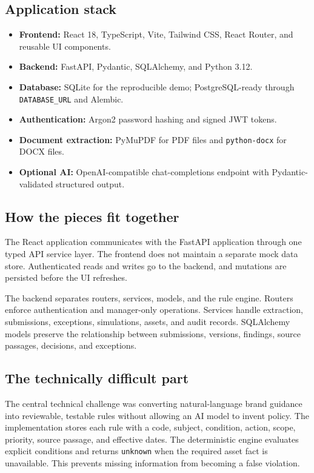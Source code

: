 \documentclass[11pt,a4paper]{article}
\begin{document}
\subsection{Application stack}

\begin{itemize}[leftmargin=*,itemsep=2pt]
  \item \textbf{Frontend:} React 18, TypeScript, Vite, Tailwind CSS, React Router, and reusable UI components.
  \item \textbf{Backend:} FastAPI, Pydantic, SQLAlchemy, and Python 3.12.
  \item \textbf{Database:} SQLite for the reproducible demo; PostgreSQL-ready through \texttt{DATABASE\_URL} and Alembic.
  \item \textbf{Authentication:} Argon2 password hashing and signed JWT tokens.
  \item \textbf{Document extraction:} PyMuPDF for PDF files and \texttt{python-docx} for DOCX files.
  \item \textbf{Optional AI:} OpenAI-compatible chat-completions endpoint with Pydantic-validated structured output.
\end{itemize}

\subsection{How the pieces fit together}

The React application communicates with the FastAPI application through one typed API
service layer. The frontend does not maintain a separate mock data store. Authenticated
reads and writes go to the backend, and mutations are persisted before the UI refreshes.

The backend separates routers, services, models, and the rule engine. Routers enforce
authentication and manager-only operations. Services handle extraction, submissions,
exceptions, simulations, assets, and audit records. SQLAlchemy models preserve the
relationship between submissions, versions, findings, source passages, decisions, and
exceptions.

\subsection{The technically difficult part}

The central technical challenge was converting natural-language brand guidance into
reviewable, testable rules without allowing an AI model to invent policy. The implementation
stores each rule with a code, subject, condition, action, scope, priority, source passage,
and effective dates. The deterministic engine evaluates explicit conditions and returns
\texttt{unknown} when the required asset fact is unavailable. This prevents missing
information from becoming a false violation.
\end{document}
